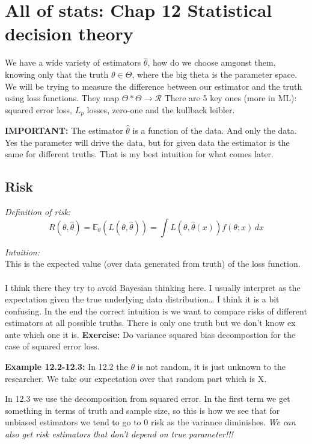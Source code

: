 \documentclass{article}
\begin{document}
\section{All of stats: Chap 12 Statistical decision theory}

We have a wide variety of estimators $\hat{\theta}$, how do we choose amgonst them, knowing only that the truth $\theta \in \Theta$, where the big theta is
the parameter space. 
We will be trying to measure the difference between our estimator and the truth using loss functions.
They map $\Theta * \Theta \rightarrow \mathcal{R} $
There are 5 key ones (more in ML): squared error loss, $L_p$ losses, zero-one and the kullback leibler.



\textbf{IMPORTANT:} The estimator $\hat{\theta}$ is a function of the data. And only the data. Yes the parameter will drive the data,
but for given data the estimator is the same for different truths. That is my best intuition for what comes later.

\subsection*{Risk}

\textit{Definition of risk:}
$$R(\theta,\hat{\theta}) = \mathbb{E}_{\theta} (L(\theta,\hat{\theta})) = \int L(\theta,\hat{\theta}(x)) f(\theta;x)  \,dx   $$


\textit{Intuition:}\\
This is the expected value (over data generated from truth) of the loss function.
\\\\
I think there they try to avoid Bayesian thinking here. I usually interpret as the expectation given  the true underlying data distribution\dots
I think it is a bit confusing. In the end the correct intuition is we want to compare risks of different estimators at 
all possible truths. There is only one truth but we don't know ex ante which one it is.
\textbf{Exercise:}
Do variance squared bias decompostion for the case of squared error loss.

\textbf{Example 12.2-12.3:}
In 12.2 the $\theta$ is not random, it is just unknown to the researcher. We take our expectation over that random part which is X.

In 12.3 we use the decomposition from squared error. In the first term we get something in terms of truth and sample size, so this is how we see that for unbiased
estimators we tend to go to 0 risk as the variance diminishes.
\textit{We can also get risk estimators that don't depend on true parameter!!!}
\end{document}
